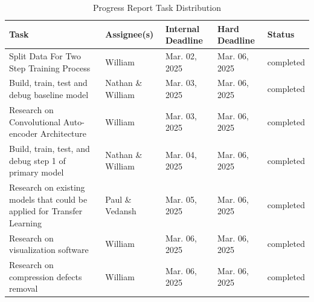 \documentclass{article} %
\begin{document}
\begin{table}[htp]
    \caption{Progress Report Task Distribution}
    \label{Progress_Report_Task_Distribution}
    \begin{center}
        \begin{tabular}{|>{\raggedright\arraybackslash}p{4cm}|>{\raggedright\arraybackslash}p{2.5cm}|>{\raggedright\arraybackslash}p{2cm}|>{\raggedright\arraybackslash}p{2cm}|>{\raggedright\arraybackslash}p{1.5cm}|}
            \hline
            \textbf{Task}                                                                                     & \textbf{Assignee(s)} & \textbf{Internal Deadline} & \textbf{Hard Deadline} & \textbf{Status} \\
            \hline
            Split Data For Two Step Training Process                                                          & William              & Mar. 02, 2025              & Mar. 06, 2025          & completed       \\
            \hline
            Build, train, test and debug baseline model                                                       & Nathan \& William    & Mar. 03, 2025              & Mar. 06, 2025          & completed       \\
            \hline
            Research on Convolutional Auto-encoder Architecture                                               & William              & Mar. 03, 2025              & Mar. 06, 2025          & completed       \\
            \hline
            Build, train, test, and debug step 1 of primary model                                             & Nathan \& William    & Mar. 04, 2025              & Mar. 06, 2025          & completed       \\
            \hline
            Research on existing models that could be applied for Transfer Learning                           & Paul \& Vedansh      & Mar. 05, 2025              & Mar. 06, 2025          & completed       \\
            \hline
            Research on visualization software                                                                & William              & Mar. 06, 2025              & Mar. 06, 2025          & completed       \\
            \hline
            Research on compression defects removal                                                           & William              & Mar. 06, 2025              & Mar. 06, 2025          & completed       \\

\end{tabular}
\end{center}
\end{table}
\end{document}
